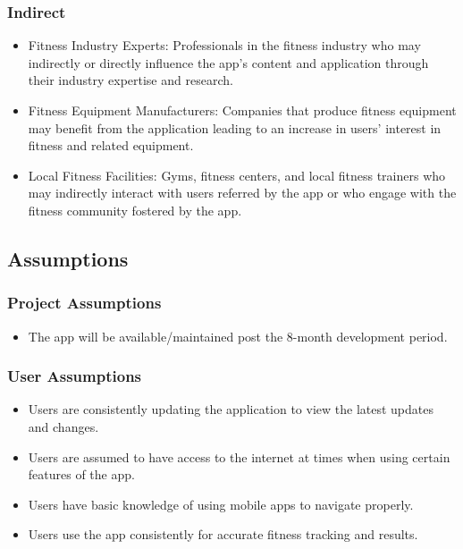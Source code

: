 \documentclass[12pt]{article}
\begin{document}
\subsubsection{Indirect}
\begin{itemize}
  \item Fitness Industry Experts: Professionals in the fitness industry who may indirectly or directly influence the app’s content and application through their industry expertise and research.
  \item Fitness Equipment Manufacturers: Companies that produce fitness equipment may benefit from the application leading to an increase in users’ interest in fitness and related equipment.
  \item Local Fitness Facilities: Gyms, fitness centers, and local fitness trainers who may indirectly interact with users referred by the app or who engage with the fitness community fostered by the app.
\end{itemize}

\subsection{Assumptions}

\subsubsection{Project Assumptions}
\begin{itemize}
  \item The app will be available/maintained post the 8-month development period.
\end{itemize}

\subsubsection{User Assumptions}
\begin{itemize}
  \item Users are consistently updating the application to view the latest updates and changes.
  \item Users are assumed to have access to the internet at times when using certain features of the app.
  \item Users have basic knowledge of using mobile apps to navigate properly.
  \item Users use the app consistently for accurate fitness tracking and results.
\end{itemize}
\end{document}
